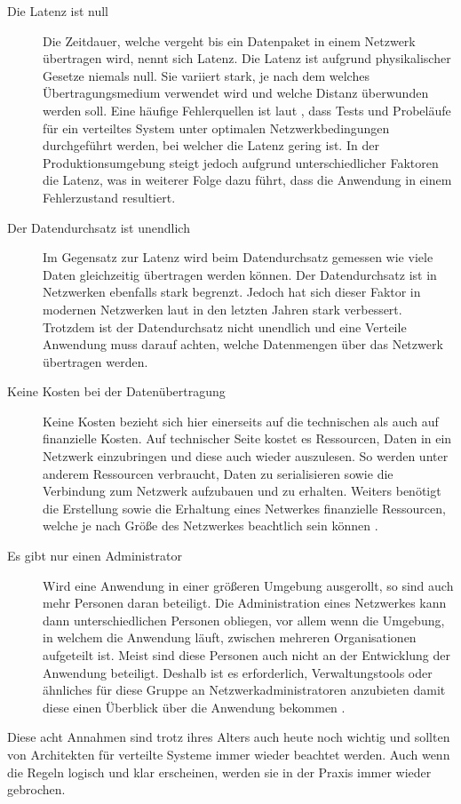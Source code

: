 \begin{description}
    \item[Die Latenz ist null]
    Die Zeitdauer, welche vergeht bis ein Datenpaket in einem Netzwerk übertragen wird, nennt sich Latenz. Die Latenz ist aufgrund physikalischer Gesetze niemals null. Sie variiert stark, je nach dem welches Übertragungsmedium verwendet wird und welche Distanz überwunden werden soll. Eine häufige  Fehlerquellen ist laut \cite{rotem2006fallacies}, dass Tests und Probeläufe für ein verteiltes System unter optimalen Netzwerkbedingungen durchgeführt werden, bei welcher die Latenz gering ist. In der Produktionsumgebung steigt jedoch aufgrund unterschiedlicher Faktoren die Latenz, was in weiterer Folge dazu führt, dass die Anwendung in einem Fehlerzustand resultiert. 
    \item[Der Datendurchsatz ist unendlich]
    Im Gegensatz zur Latenz wird beim Datendurchsatz gemessen wie viele Daten gleichzeitig übertragen werden können. Der Datendurchsatz ist in Netzwerken ebenfalls stark begrenzt. Jedoch hat sich dieser Faktor in modernen Netzwerken laut \cite{rotem2006fallacies} in den letzten Jahren stark verbessert. Trotzdem ist der Datendurchsatz nicht unendlich und eine Verteile Anwendung muss darauf achten, welche Datenmengen über das Netzwerk übertragen werden.  
    \item[Keine Kosten bei der Datenübertragung]
    Keine Kosten bezieht sich hier einerseits auf die technischen als auch auf finanzielle Kosten. Auf technischer Seite kostet es Ressourcen, Daten in ein Netzwerk einzubringen und diese auch wieder auszulesen. So werden unter anderem Ressourcen verbraucht, Daten zu serialisieren sowie die Verbindung zum Netzwerk aufzubauen und zu erhalten. Weiters benötigt die Erstellung sowie die Erhaltung eines Netwerkes finanzielle Ressourcen, welche je nach Größe des Netzwerkes beachtlich sein können \cite{rotem2006fallacies}.
    \item[Es gibt nur einen Administrator]
    Wird eine Anwendung in einer größeren Umgebung ausgerollt, so sind auch mehr Personen daran beteiligt. Die Administration eines Netzwerkes kann dann unterschiedlichen Personen obliegen, vor allem wenn die Umgebung, in welchem die Anwendung läuft, zwischen mehreren Organisationen aufgeteilt ist. Meist sind diese Personen auch nicht an der Entwicklung der Anwendung beteiligt. Deshalb ist es erforderlich, Verwaltungstools oder ähnliches für diese Gruppe an Netzwerkadministratoren anzubieten damit diese einen Überblick über die Anwendung bekommen \cite{rotem2006fallacies}.  
\end{description}
Diese acht Annahmen sind trotz ihres Alters auch heute noch wichtig und sollten von Architekten für verteilte Systeme immer wieder beachtet werden. Auch wenn die Regeln logisch und klar erscheinen, werden sie in der Praxis immer wieder gebrochen. \cite{rotem2006fallacies} 

